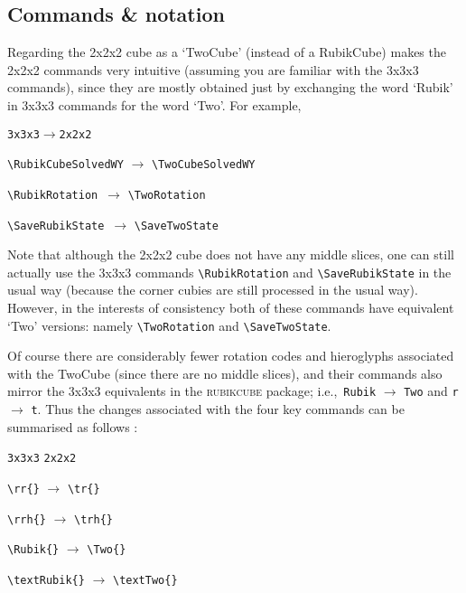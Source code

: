 \documentclass[a4paper]{article}
\begin{document}
\subsection{Commands \& notation} 

Regarding the 2x2x2 cube as a `TwoCube' (instead of  a RubikCube) makes 
the 2x2x2 commands very intuitive (assuming you are familiar with the
3x3x3 commands), since they are mostly obtained just by exchanging 
the word `Rubik' in  3x3x3 commands for the word `Two'. For example,

\medskip
  
\verb!3x3x3!\quad\hspace{1cm}$\rightarrow$\quad\hspace{1cm}\verb!2x2x2!  
 
\smallskip

\verb!\RubikCubeSolvedWY!   $\rightarrow$  \verb!\TwoCubeSolvedWY!

\verb!\RubikRotation!\qquad\ $\rightarrow$ \quad\verb!\TwoRotation!

\verb!\SaveRubikState!\qquad\ $\rightarrow$  \quad\verb!\SaveTwoState! 

\medskip

Note that  although the 2x2x2 cube does not have any middle slices, one can still
 actually use the 3x3x3 commands \verb!\RubikRotation! and \verb!\SaveRubikState! 
 in the usual way (because the corner cubies are still processed in 
the usual way). However, in the interests of consistency 
both of these  commands have  equivalent `Two' versions: namely
\verb!\TwoRotation! and  \verb!\SaveTwoState!.

Of course there are considerably fewer rotation  codes and hieroglyphs 
associated with the TwoCube (since there are no middle slices), and 
their commands also mirror the 3x3x3 equivalents in  the \textsc{rubikcube} 
package; i.e.,~\verb!Rubik! $\rightarrow$ \verb!Two! and 
\verb!r! $\rightarrow$ \verb!t!.  Thus the changes  associated with the 
four key commands  can be summarised as  follows : 

 \medskip
  
 \verb!3x3x3! \hphantom{$\rightarrow$} \verb!2x2x2!  
 
 \smallskip
 
 \verb!\rr{}! $\rightarrow$ \verb!\tr{}!

 \verb!\rrh{}! $\rightarrow$ \verb!\trh{}!

 \verb!\Rubik{}! $\rightarrow$ \verb!\Two{}!

 \verb!\textRubik{}! $\rightarrow$ \verb!\textTwo{}!
\end{document}
